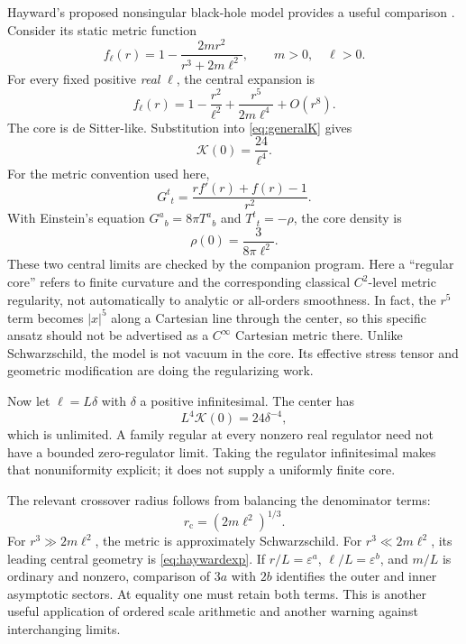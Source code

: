 \documentclass[11pt,letterpaper]{article}
\newcommand{\eps}{\varepsilon}
\newcommand{\Kretsch}{\mathcal K}
\theoremstyle{definition}
\theoremstyle{remark}
\begin{document}
Hayward's proposed nonsingular black-hole model provides a useful comparison
\cite{Hayward}. Consider its static metric function
\begin{equation}
 f_\ell(r)=1-\frac{2mr^2}{r^3+2m\ell^2},
 \qquad m>0,\quad\ell>0.
 \label{eq:hayward}
\end{equation}
For every fixed positive \emph{real} $\ell$, the central expansion is
\begin{equation}
 f_\ell(r)=1-\frac{r^2}{\ell^2}
                  +\frac{r^5}{2m\ell^4}+O(r^8).
 \label{eq:haywardexp}
\end{equation}
The core is de Sitter-like. Substitution into \eqref{eq:generalK} gives
\begin{equation}
 \Kretsch(0)=\frac{24}{\ell^4}.
 \label{eq:haywardK}
\end{equation}
For the metric convention used here,
\[
 G^t{}_t=\frac{r f'(r)+f(r)-1}{r^2}.
\]
With Einstein's equation $G^a{}_b=8\pi T^a{}_b$ and
$T^t{}_t=-\rho$, the core density is
\begin{equation}
 \rho(0)=\frac{3}{8\pi\ell^2}.
 \label{eq:haywardrho}
\end{equation}
These two central limits are checked by the companion program. Here a
``regular core'' refers to finite curvature and the corresponding classical
$C^2$-level metric regularity, not automatically to analytic or all-orders
smoothness. In fact, the $r^5$ term becomes $|x|^5$ along a Cartesian line
through the center, so this specific ansatz should not be advertised as a
$C^\infty$ Cartesian metric there. Unlike
Schwarzschild, the model is not vacuum in the core. Its effective stress tensor
and geometric modification are doing the regularizing work.

Now let $\ell=L\delta$ with $\delta$ a positive infinitesimal. The center has
\[
 L^4\Kretsch(0)=24\delta^{-4},
\]
which is unlimited. A family regular at every nonzero real regulator need not
have a bounded zero-regulator limit. Taking the regulator infinitesimal makes
that nonuniformity explicit; it does not supply a uniformly finite core.

The relevant crossover radius follows from balancing the denominator terms:
\begin{equation}
 r_{\mathrm c}=(2m\ell^2)^{1/3}.
 \label{eq:haywardcrossover}
\end{equation}
For $r^3\gg2m\ell^2$, the metric is approximately Schwarzschild. For
$r^3\ll2m\ell^2$, its leading central geometry is \eqref{eq:haywardexp}.
If $r/L=\eps^a$, $\ell/L=\eps^b$, and $m/L$ is ordinary and nonzero,
comparison of $3a$ with $2b$ identifies the outer and inner asymptotic sectors.
At equality one must retain both terms. This is another useful application of
ordered scale arithmetic and another warning against interchanging limits.
\end{document}
